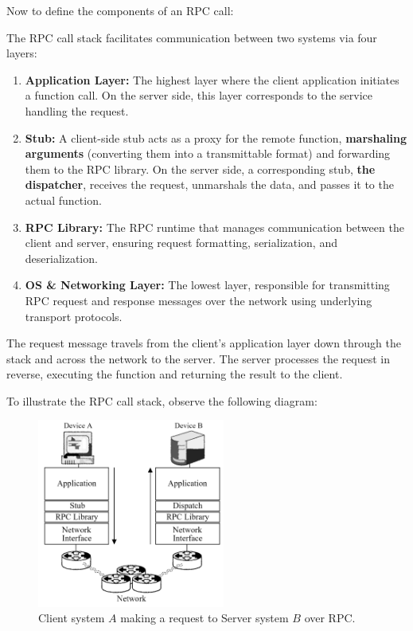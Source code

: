 \noindent
Now to define the components of an RPC call:
\begin{Def}

    The RPC call stack facilitates communication between two systems via four layers:
    
    \begin{enumerate}
        \item \textbf{Application Layer:} The highest layer where the client application initiates a function call. On the server side, this layer corresponds to the service handling the request.
        
        \item \textbf{Stub:} A client-side stub acts as a proxy for the remote function, \textbf{marshaling arguments} (converting them into a transmittable format) and forwarding them to the RPC library. On the server side,
        a corresponding stub, \textbf{the dispatcher}, receives the request, unmarshals the data, and passes it to the actual function.
        
        \item \textbf{RPC Library:} The RPC runtime that manages communication between the client and server, ensuring request formatting, serialization, and deserialization.
        
        \item \textbf{OS \& Networking Layer:} The lowest layer, responsible for transmitting RPC request and response messages over the network using underlying transport protocols.
    \end{enumerate}
    
    The request message travels from the client's application layer down through the stack and across the network to the server. The server processes the request in reverse, executing the function and returning the result to the client.
\end{Def}
    
\newpage 

\noindent
To illustrate the RPC call stack, observe the following diagram:
\begin{figure}[h]
    \centering
    \includegraphics[width=0.55\textwidth]{Sections/rpc/rpc_stack.png}
    \caption{Client system $A$ making a request to Server system $B$ over RPC.}
    \label{fig:rpc_stack}
\end{figure}


